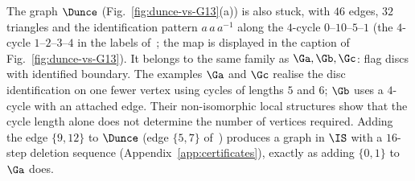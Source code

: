 The graph $\Dunce$ (Fig.~\ref{fig:dunce-vs-G13}(a)) is also stuck, with $46$ edges, $32$ triangles and the identification pattern $a\,a\,a^{-1}$ along the $4$-cycle $0\text{--}10\text{--}5\text{--}1$ (the $4$-cycle $1\text{--}2\text{--}3\text{--}4$ in the labels of~\cite[Fig.~2A]{DEFH2023}; the map is displayed in the caption of Fig.~\ref{fig:dunce-vs-G13}). It belongs to the same family as $\Ga,\Gb,\Gc$: flag discs with identified boundary. The examples $\Ga$ and $\Gc$ realise the disc identification on one fewer vertex using cycles of lengths $5$ and $6$; $\Gb$ uses a $4$-cycle with an attached edge. Their non-isomorphic local structures show that the cycle length alone does not determine the number of vertices required. Adding the edge $\{9,12\}$ to $\Dunce$ (edge $\{5,7\}$ of~\cite[Fig.~2B]{DEFH2023}) produces a graph in $\IS$ with a $16$-step deletion sequence (Appendix~\ref{app:certificates}), exactly as adding $\{0,1\}$ to $\Ga$ does.

\FloatBarrier
